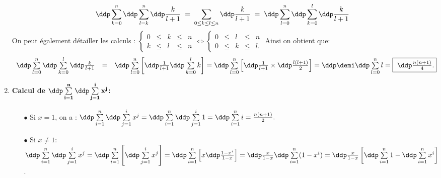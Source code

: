 \begin{correction}
\begin{enumerate}
$$\ddp \sum\limits_{k=0}^n\ddp \sum\limits_{l=k}^n \ddp\frac{k}{l+1} \; = \; \sum_{0\leq k \leq l \leq n} \ddp\frac{k}{l+1}  \; = \;  \ddp \sum\limits_{l=0}^n\ddp \sum\limits_{k=0}^l \ddp\frac{k}{l+1}$$
On peut \'egalement d\'etailler les calculs : $\left\lbrace \begin{array}{lllll}
0 & \leq & k & \leq & n\\
k & \leq & l & \leq & n
\end{array}\right.
\Longleftrightarrow
\left\lbrace \begin{array}{lllll}
0 & \leq &l & \leq & n\\
0 & \leq & k & \leq & l.
\end{array}\right.
$
Ainsi on obtient que: $$\begin{array}{lll}
\ddp \sum\limits_{l=0}^n\ddp \sum\limits_{k=0}^l \ddp\frac{k}{l+1}&=& \ddp \sum\limits_{l=0}^n\left\lbrack \ddp\frac{1}{l+1}
 \ddp \sum\limits_{k=0}^l k\right\rbrack
=  \ddp \sum\limits_{l=0}^n\left\lbrack   \ddp\frac{1}{l+1}  \times \ddp\frac{l(l+1)}{2} \right\rbrack
=\ddp\demi  \ddp \sum\limits_{l=0}^n l=\fbox{ $\ddp\frac{n(n+1)}{4}$.}
\end{array}$$
\item  \textbf{Calcul de $\mathbf{\ddp \sum\limits_{i=1}^n\ddp \sum\limits_{j=1}^i x^j}$:} 
\begin{itemize}
\item[$\bullet$] Si $x=1$, on a : $\ddp \sum\limits_{i=1}^n\ddp \sum\limits_{j=1}^i x^j = \ddp \sum\limits_{i=1}^n\ddp \sum\limits_{j=1}^i 1 = \ddp \sum\limits_{i=1}^n i = \frac{n(n+1)}{2}.$ 
\item[$\bullet$] Si $x\not= 1$:
\noindent  $\ddp \sum\limits_{i=1}^n\ddp \sum\limits_{j=1}^i x^j=\ddp \sum\limits_{i=1}^n\left\lbrack \ddp \sum\limits_{j=1}^i x^j \right\rbrack=\ddp \sum\limits_{i=1}^n\left\lbrack x\ddp\frac{1-x^{i}  }{1-x} \right\rbrack
= \ddp\frac{x}{1-x}  \ddp \sum\limits_{i=1}^n (1-x^{i}) =\ddp\frac{x}{1-x}  \left\lbrack \ddp \sum\limits_{i=1}^n  1 -  \ddp \sum\limits_{i=1}^n  x^i   \right\rbrack$. \\

\end{itemize}
\end{enumerate}
\end{correction}
